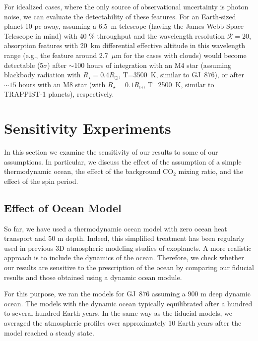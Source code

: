 \documentclass[11pt,numberedappendix,twocolappendix,]{emulateapj}
\begin{document}
For idealized cases, where the only source of observational uncertainty is photon noise, we can evaluate the detectability of these features. For an Earth-sized planet 10 pc away, assuming a 6.5~m telescope (having the James Webb Space Telescope in mind) with 40 \% throughput and the wavelength resolution $\mathcal{R}=$20, absorption features with 20~km differential effective altitude in this wavelength range (e.g., the feature around 2.7~$\mu$m for the cases with clouds) would become detectable (5$\sigma $) after $\sim 100$ hours of integration with an M4 star (assuming blackbody radiation with $R_{\star }=0.4 R_{\odot }$, T=3500~K, similar to GJ~876), or after $\sim 15$ hours with an M8 star (with $R_{\star }=0.1 R_{\odot }$, T=2500~K, similar to TRAPPIST-1 planets), respectively. 




\section{Sensitivity Experiments }
\label{s:sensitivity}

In this section we examine the sensitivity of our results to some of our assumptions. 
In particular, we discuss the effect of the assumption of a simple thermodynamic ocean, the effect of the background CO$_2$ mixing ratio, and the effect of the spin period. 


\subsection{Effect of Ocean Model}
\label{ss:sensitivity_ocean}

So far, we have used a thermodynamic ocean model with zero ocean heat transport and 50 m depth. 
Indeed, this simplified treatment has been regularly used in previous 3D atmospheric modeling studies of exoplanets. 
A more realistic approach is to include the dynamics of the ocean. 
Therefore, we check whether our results are sensitive to the prescription of the ocean by comparing our fiducial results and those obtained using a dynamic ocean module. 

For this purpose, we ran the models for GJ~876 assuming a 900 m deep dynamic ocean. 
The models with the dynamic ocean typically equilibrated after a hundred to several hundred Earth years. 
In the same way as the fiducial models, we averaged the atmospheric profiles  over approximately 10 Earth years after the model reached a steady state. 
\end{document}
